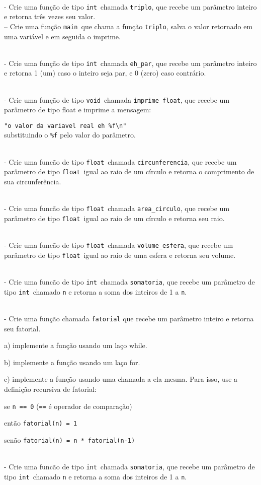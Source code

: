 \documentclass{book}
\newcommand{\NEWLINE}{~\\}
\newcommand{\VOID}{{\tt void}}
\newcommand{\INT}{{\tt int}}
\newcommand{\FLOAT}{{\tt float}}
\newcommand{\MAIN}{{\tt main}}
\begin{document}
\NEWLINE
\quest - Crie uma função de tipo \INT\ chamada {\tt triplo}, que recebe um parâmetro inteiro e retorna três vezes seu valor.
\NEWLINE
\quest – Crie uma função \MAIN\ que chama a função {\tt triplo}, salva o valor retornado em uma variável e em seguida o imprime.

\NEWLINE
\quest - Crie uma função de tipo \INT\ chamada \verb|eh_par|, que recebe um parâmetro inteiro e retorna 1 (um) caso o inteiro seja par, e 0 (zero) caso contrário.

\NEWLINE
\quest - Crie uma função de tipo \VOID\ chamada \verb|imprime_float|, que recebe um parâmetro de tipo float e imprime a mensagem:

\verb|"o valor da variavel real eh %f\n"|
\\
substituindo o \verb|%f| pelo valor do parâmetro.



\NEWLINE
\quest - Crie uma funcão de tipo \FLOAT\ chamada \verb|circunferencia|, que recebe um parâmetro de tipo \FLOAT\ igual ao raio de um círculo e retorna o comprimento de sua circunferência.

\NEWLINE
\quest - Crie uma funcão de tipo \FLOAT\ chamada \verb|area_circulo|, que recebe um parâmetro de tipo \FLOAT\ igual ao raio de um círculo e retorna seu raio.

\NEWLINE
\quest - Crie uma funcão de tipo \FLOAT\ chamada \verb|volume_esfera|, que recebe um parâmetro de tipo \FLOAT\ igual ao raio de uma esfera e retorna seu volume.

\NEWLINE
\quest - Crie uma funcão de tipo \INT\ chamada \verb|somatoria|, que recebe um parâmetro de tipo \INT\ chamado {\tt n} e retorna a soma dos inteiros de 1 a {\tt n}.

\NEWLINE
\quest - Crie uma função chamada {\tt fatorial} que recebe um parâmetro inteiro e retorna seu fatorial.

	a) implemente a função usando um laço while.

	b) implemente a função usando um laço for.

	c) implemente a função usando uma chamada a ela mesma. Para isso, use a definição recursiva de fatorial:

		se {\tt n == 0} ({\tt ==} é operador de comparação) 

então {\tt fatorial(n) = 1}

		senão {\tt fatorial(n) = n * fatorial(n-1)}

\NEWLINE
\quest - Crie uma funcão de tipo \INT\ chamada {\tt somatoria}, que recebe um parâmetro de tipo \INT\ chamado {\tt n} e retorna a soma dos inteiros de 1 a {\tt n}.
\end{document}
